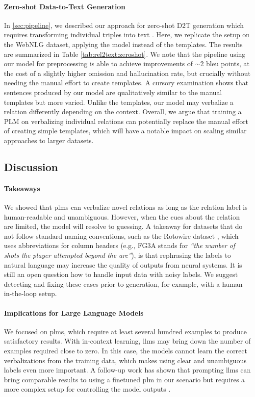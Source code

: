 \paragraph{Zero-shot Data-to-Text Generation} In \autoref{sec:pipeline}, we described our approach for zero-shot D2T generation which requires transforming individual triples into text \cite{kasner2022neural}. Here, we replicate the setup on the WebNLG dataset, applying the \BARTr{} model instead of the templates. The results are summarized in Table \ref{tab:rel2text:zeroshot}.  We note that the pipeline using our model for preprocessing is able to achieve improvements of $\sim$2 \acs{bleu} points, at the cost of a slightly higher omission and hallucination rate, but crucially without needing the manual effort to create templates. A cursory examination shows that sentences produced by our model are qualitatively similar to the manual templates but more varied. Unlike the templates, our model may verbalize a relation differently depending on the context.
Overall, we argue that training a PLM on verbalizing individual relations can potentially replace the manual effort of creating simple templates, which will have a notable impact on scaling similar approaches to larger datasets.


\subsection{Discussion}

\paragraph{Takeaways} We showed that \acp{plm} can verbalize novel relations as long as the relation label is human-readable and unambiguous. However, when the cues about the relation are limited, the model will resolve to guessing. A takeaway for datasets that do not follow standard naming conventions, such as the Rotowire dataset \cite{wiseman2017challenges}, which uses abbreviations for column headers (e.g., FG3A stands for \textit{``the number of shots the player attempted beyond the arc''}), is that rephrasing the labels to natural language may increase the quality of outputs from neural systems. It is still an open question how to handle input data with noisy labels. We suggest detecting and fixing these cases prior to generation, for example, with a human-in-the-loop setup.


\paragraph{Implications for Large Language Models} We focused on \acp{plm}, which require at least several hundred examples to produce satisfactory results. With in-context learning, \acp{llm} may bring down the number of examples required close to zero. In this case, the models cannot learn the correct verbalizations from the training data, which makes using clear and unambiguous labels even more important. A follow-up work has shown that prompting \acp{llm} can bring comparable results to using a finetuned \ac{plm} in our scenario but requires a more complex setup for controlling the model outputs \cite{vejvarASPIROAnyshotStructured2023}.

